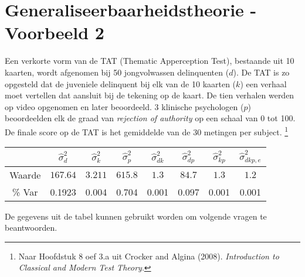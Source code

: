 \OPGAVE
{
\section{Generaliseerbaarheidstheorie - Voorbeeld 2}

Een verkorte vorm van de TAT (Thematic Apperception Test), bestaande uit 10 kaarten, wordt afgenomen bij 50
jongvolwassen delinquenten ($d$).
De TAT is zo opgesteld dat de juveniele delinquent bij elk van de 10 kaarten ($k$) een verhaal moet vertellen dat aansluit bij de tekening op de kaart.
De tien verhalen werden op video opgenomen en later beoordeeld.
3 klinische psychologen ($p$) beoordeelden elk de graad van \emph{rejection of authority} op een schaal van 0 tot 100.
De finale score op de TAT is het gemiddelde van de 30 metingen per subject. \footnote{
Naar Hoofdstuk 8 oef 3.a uit Crocker and Algina (2008). \emph{Introduction to Classical and Modern Test Theory}.}

\begin{center}
\renewcommand{\arraystretch}{1.2}
\begin{tabular}{|c|c|c|c|c|c|c|c|} \hline
 & $ \hat{\sigma}^2_{d} $ & $ \hat{\sigma}^2_{k} $& $ \hat{\sigma}^2_{p} $ & $ \hat{\sigma}^2_{dk} $ & $ \hat{\sigma}^2_{dp} $ & $ \hat{\sigma}^2_{kp} $ & $ \hat{\sigma}^2_{dkp,e} $ \\ \hline
Waarde  & $ 167.64 $ & $ 3.211 $ & $615.8 $ & $ 1.3 $ & $ 84.7 $ & $ 1.3 $ & $ 1.2 $ \\
\% Var & 0.1923& 0.004& 0.704& 0.001& 0.097& 0.001& 0.001 \\ \hline
\end{tabular}
\end{center}

\normalsize
De gegevens uit de tabel kunnen gebruikt worden om volgende vragen te beantwoorden.

}
